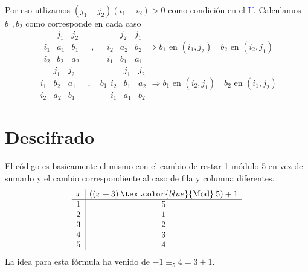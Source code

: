 \documentclass{article}
\begin{document}
Por eso utlizamos $(j_1-j_2)(i_1-i_2) > 0$ como condición en el \textcolor{blue}{If}. Calculamos $b_1, b_2$ como corresponde en cada caso
$$
\begin{array}{c|ccc}
     & j_1 & j_2 \\ \hline
    i_1 & a_1 & b_1 \\
    i_2 & b_2 & a_2 
\end{array}\quad , \quad
\begin{array}{c|ccc}
    & j_2 & j_1 \\ \hline
   i_2 & a_2 & b_2 \\
   i_1 & b_1 & a_1 
\end{array} 
\Rightarrow b_1 \text{ en } (i_1, j_2) \quad b_2 \text{ en } (i_2, j_1)
$$
$$
\begin{array}{c|ccc}
     & j_1 & j_2 \\ \hline
    i_1 & b_2 & a_1 \\
    i_2 & a_2 & b_1
\end{array}\quad , \quad b_1 
\begin{array}{c|ccc}
    & j_1 & j_2 \\ \hline
    i_2 & b_1 & a_2 \\
    i_1 & a_1 & b_2
\end{array}
\Rightarrow b_1 \text{ en } (i_2, j_1) \quad b_2 \text{ en } (i_1, j_2)
$$

\section*{Descifrado}
El código es basicamente el mismo con el cambio de restar 1 módulo 5 en vez de sumarlo y el cambio correspondiente al caso de fila y columna diferentes.
$$
\begin{array}{c|c}
    x & ((x+3) \: \textcolor{blue}{\text{Mod}} \: 5) + 1 \\ \hline
    1 & 5 \\
    2 & 1 \\
    3 & 2 \\
    4 & 3 \\
    5 & 4 \\
\end{array}
$$
La idea para esta fórmula ha venido de $-1\equiv_5 4 = 3 + 1$.
\end{document}
